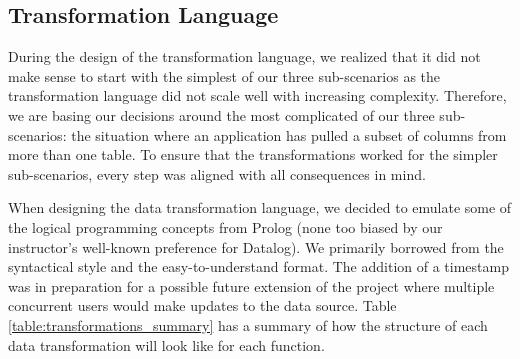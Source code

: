 \documentclass[12pt]{article}
\begin{document}
\subsection{Transformation Language}
\label{sec:transformation_language}
During the design of the transformation language, we realized that it did not make sense to start with the simplest of our three sub-scenarios as the transformation language did not scale well with increasing complexity. Therefore, we are basing our decisions around the most complicated of our three sub-scenarios: the situation where an application has pulled a subset of columns from more than one table.  To ensure that the transformations worked for the simpler sub-scenarios, every step was aligned with all consequences in mind.

When designing the data transformation language, we decided to emulate some of the logical programming concepts from Prolog (none too biased by our instructor's well-known preference for Datalog).  We primarily borrowed from the syntactical style and the easy-to-understand format. The addition of a timestamp was in preparation for a possible future extension of the project where multiple concurrent users would make updates to the data source. Table \ref{table:transformations_summary} has a summary of how the structure of each data transformation will look like for each function.
\end{document}

